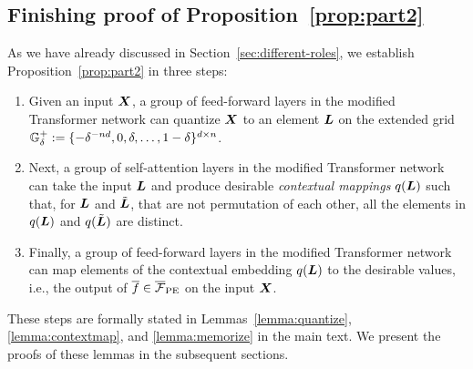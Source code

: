 \subsection{Finishing proof of Proposition~\ref{prop:part2}}
\label{sec:appx_proof_prop}


As we have already discussed in Section~\ref{sec:different-roles}, we establish Proposition~\ref{prop:part2} in three steps: 
\begin{enumerate}
\item Given an input ${\bm{X}}$, a group of feed-forward layers in the modified Transformer network can quantize ${\bm{X}}$ to an element ${\bm{L}}$ on the extended grid ${\mathbb{G}}^+_{\delta} := \{ -\delta^{-nd}, 0, \delta, \dots, 1-\delta \}^{d \times n}$.
\item Next, a group of self-attention layers in the modified Transformer network can take the input ${\bm{L}}$ and produce desirable {\em contextual mappings} $q({\bm{L}})$ such that, for ${\bm{L}}$ and $\tilde{{\bm{L}}}$, that are not permutation of each other, all the elements in $q({\bm{L}})$ and $q(\tilde{{\bm{L}}})$ are distinct.
\item Finally, a group of feed-forward layers in the modified Transformer network can map elements of the contextual embedding $q({\bm{L}})$ to the desirable values, i.e., the output of $\overline{f} \in \overline{\mathcal{F}}_{\rm PE}$ on the input ${\bm{X}}$.
\end{enumerate}
These steps are formally stated in Lemmas~\ref{lemma:quantize}, \ref{lemma:contextmap}, and \ref{lemma:memorize} in the main text. We present the proofs of these lemmas in the subsequent sections.

